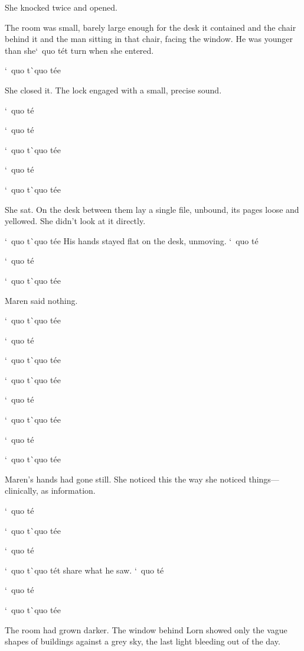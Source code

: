 \documentclass[12pt,letterpaper,openany]{book}
\begin{document}
\par
She knocked twice and opened.
\par
The room was small, barely large enough for the desk it contained and the chair behind it and the man sitting in that chair, facing the window. He was younger than she`\ quo t\'e{}t turn when she entered.
\par
`\ quo t\`\ quo t\'e{}e{}
\par
She closed it. The lock engaged with a small, precise sound.
\par
`\ quo t\'e{}
\par
`\ quo t\'e{}
\par
`\ quo t\`\ quo t\'e{}e{}
\par
`\ quo t\'e{}
\par
`\ quo t\`\ quo t\'e{}e{}
\par
She sat. On the desk between them lay a single file, unbound, its pages loose and yellowed. She didn't look at it directly.
\par
`\ quo t\`\ quo t\'e{}e{} His hands stayed flat on the desk, unmoving. `\ quo t\'e{}
\par
`\ quo t\'e{}
\par
`\ quo t\`\ quo t\'e{}e{}
\par
Maren said nothing.
\par
`\ quo t\`\ quo t\'e{}e{}
\par
`\ quo t\'e{}
\par
`\ quo t\`\ quo t\'e{}e{}
\par
`\ quo t\`\ quo t\'e{}e{}
\par
`\ quo t\'e{}
\par
`\ quo t\`\ quo t\'e{}e{}
\par
`\ quo t\'e{}
\par
`\ quo t\`\ quo t\'e{}e{}
\par
Maren's hands had gone still. She noticed this the way she noticed things—clinically, as information.
\par
`\ quo t\'e{}
\par
`\ quo t\`\ quo t\'e{}e{}
\par
`\ quo t\'e{}
\par
`\ quo t\`\ quo t\'e{}t share what he saw. `\ quo t\'e{}
\par
`\ quo t\'e{}
\par
`\ quo t\`\ quo t\'e{}e{}
\par
The room had grown darker. The window behind Lorn showed only the vague shapes of buildings against a grey sky, the last light bleeding out of the day.
\end{document}

